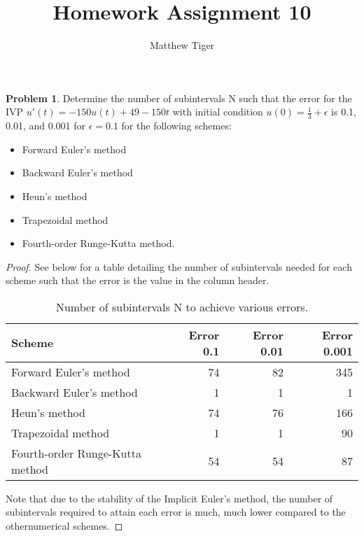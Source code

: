 \documentclass[12pt]{article}
\title{Homework Assignment 10}
\author{Matthew Tiger}
\theoremstyle{definition}
\newtheorem{problem}{Problem}
\begin{document}
\maketitle


\begin{problem} Determine the number of subintervals N such that the error for
  the IVP $u'(t) = -150 u(t) +49 - 150t$ with initial condition $u(0) = \frac{1}{3} + \epsilon$
  is 0.1, 0.01, and 0.001 for $\epsilon = 0.1$ for the following schemes:
  \begin{itemize}
    \item Forward Euler's method
    \item Backward Euler's method
    \item Heun's method
    \item Trapezoidal method
    \item Fourth-order Runge-Kutta method.
  \end{itemize}
\end{problem}

\begin{proof}
See below for a table detailing the number of subintervals needed for each
scheme such that the error is the value in the column header.

\begin{table}[h!]
  \begin{center}
    \label{tab:table1}
    \begin{tabular}{|l|r|r|r|}
      \hline
      \textbf{Scheme} & \textbf{Error 0.1} & \textbf{Error 0.01} & \textbf{Error 0.001}\\
      \hline
      Forward Euler's method & 74 & 82 & 345 \\
      Backward Euler's method & 1 & 1 & 1 \\
      Heun's method & 74 & 76 & 166 \\
      Trapezoidal method & 1 & 1 & 90 \\
      Fourth-order Runge-Kutta method & 54 & 54 & 87\\
      \hline
    \end{tabular}
    \caption{Number of subintervals N to achieve various errors.}
  \end{center}
\end{table}

Note that due to the stability of the Implicit Euler's method, the number of
subintervals required to attain each error is much, much lower compared to the
othernumerical schemes.
\end{proof}
\end{document}
